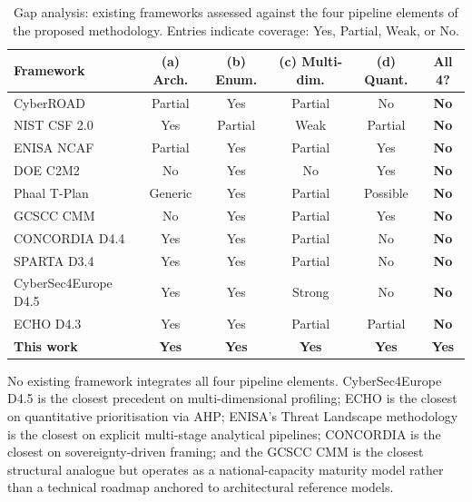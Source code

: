 \begin{table}[!ht]
\centering
\caption{Gap analysis: existing frameworks assessed against the four
pipeline elements of the proposed methodology. Entries indicate coverage:
Yes, Partial, Weak, or No.}
\label{tab:gap_analysis}
\footnotesize
\begin{tabular}{p{3.8cm} c c c c c}
\toprule
\textbf{Framework} &
\textbf{(a) Arch.} &
\textbf{(b) Enum.} &
\textbf{(c) Multi-dim.} &
\textbf{(d) Quant.} &
\textbf{All 4?} \\
\midrule
CyberROAD~\cite{ariu2016}
    & Partial & Yes & Partial & No & \textbf{No} \\
NIST CSF 2.0~\cite{nist_csf2}
    & Yes & Partial & Weak & Partial & \textbf{No} \\
ENISA NCAF~\cite{enisa_ncaf}
    & Partial & Yes & Partial & Yes & \textbf{No} \\
DOE C2M2~\cite{doe_c2m2}
    & No & Yes & No & Yes & \textbf{No} \\
Phaal T-Plan~\cite{phaal2004}
    & Generic & Yes & Partial & Possible & \textbf{No} \\
GCSCC CMM~\cite{gcscc_cmm}
    & No & Yes & Partial & Yes & \textbf{No} \\
CONCORDIA D4.4~\cite{concordia}
    & Yes & Yes & Partial & No & \textbf{No} \\
SPARTA D3.4~\cite{sparta_d34}
    & Yes & Yes & Partial & No & \textbf{No} \\
CyberSec4Europe D4.5~\cite{cybersec4europe_d45}
    & Yes & Yes & Strong & No & \textbf{No} \\
ECHO D4.3~\cite{echo_d43}
    & Yes & Yes & Partial & Partial & \textbf{No} \\
\textbf{This work}
    & \textbf{Yes} & \textbf{Yes} & \textbf{Yes} & \textbf{Yes}
    & \textbf{Yes} \\
\bottomrule
\end{tabular}
\end{table}

No existing framework integrates all four pipeline elements.
CyberSec4Europe D4.5 is the closest precedent on multi-dimensional
profiling; ECHO is the closest on quantitative prioritisation via AHP;
ENISA's Threat Landscape methodology is the closest on explicit
multi-stage analytical pipelines; CONCORDIA is the closest on
sovereignty-driven framing; and the GCSCC CMM is the closest structural
analogue but operates as a national-capacity maturity model rather than
a technical roadmap anchored to architectural reference models.

